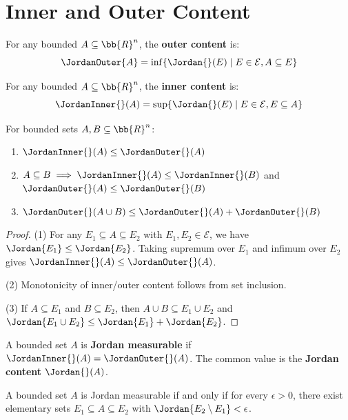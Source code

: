 \section{Inner and Outer Content}

\begin{definition}
For any bounded $A \subseteq \bb{R}^n$, the \textbf{outer content} is:
\[ \JordanOuter{A} = \inf \{ \Jordan{}(E) \mid E \in \mathcal{E}, A \subseteq E \} \]
\end{definition}

\begin{definition}
For any bounded $A \subseteq \bb{R}^n$, the \textbf{inner content} is:
\[ \JordanInner{}(A) = \sup \{ \Jordan{}(E) \mid E \in \mathcal{E}, E \subseteq A \} \]
\end{definition}

\begin{proposition}[Properties]
For bounded sets $A, B \subseteq \bb{R}^n$:
\begin{enumerate}
    \item $\JordanInner{}(A) \leq \JordanOuter{}(A)$
    \item $A \subseteq B \implies \JordanInner{}(A) \leq \JordanInner{}(B)$ and $\JordanOuter{}(A) \leq \JordanOuter{}(B)$
    \item $\JordanOuter{}(A \cup B) \leq \JordanOuter{}(A) + \JordanOuter{}(B)$
\end{enumerate}
\end{proposition}

\begin{proof}
(1) For any $E_1 \subseteq A \subseteq E_2$ with $E_1, E_2 \in \mathcal{E}$, we have $\Jordan{E_1} \leq \Jordan{E_2}$. Taking supremum over $E_1$ and infimum over $E_2$ gives $\JordanInner{}(A) \leq \JordanOuter{}(A)$.

(2) Monotonicity of inner/outer content follows from set inclusion.

(3) If $A \subseteq E_1$ and $B \subseteq E_2$, then $A \cup B \subseteq E_1 \cup E_2$ and $\Jordan{E_1 \cup E_2} \leq \Jordan{E_1} + \Jordan{E_2}$.
\end{proof}

\begin{definition}
A bounded set $A$ is \textbf{Jordan measurable} if $\JordanInner{}(A) = \JordanOuter{}(A)$. The common value is the \textbf{Jordan content} $\Jordan{}(A)$.
\end{definition}

\begin{theorem}
A bounded set $A$ is Jordan measurable if and only if for every $\epsilon > 0$, there exist elementary sets $E_1 \subseteq A \subseteq E_2$ with $\Jordan{E_2 \setminus E_1} < \epsilon$.
\end{theorem}

